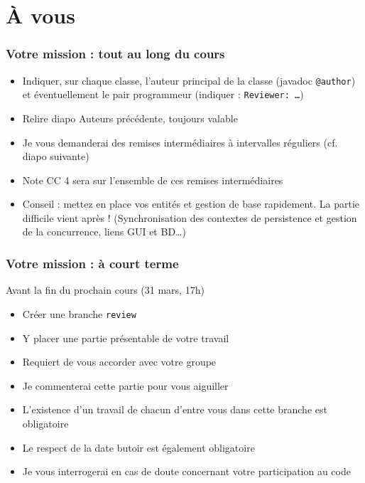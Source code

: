 \documentclass[english, french]{beamer}
\begin{document}
\section{À vous}
\begin{frame}
	\frametitle{Votre mission : tout au long du cours}
	\begin{itemize}
		\item Indiquer, sur chaque classe, l’auteur principal de la classe (javadoc \texttt{@author}) et éventuellement le pair programmeur (indiquer : \texttt{Reviewer: …})
		\item Relire diapo Auteurs précédente, toujours valable
		\item Je vous demanderai des remises intermédiaires à intervalles réguliers (cf. diapo suivante)
		\item Note CC 4 sera sur l’ensemble de ces remises intermédiaires
		\item Conseil : mettez en place vos entités et gestion de base rapidement. La partie difficile vient après ! (Synchronisation des contextes de persistence et gestion de la concurrence, liens GUI et BD…)
	\end{itemize}
\end{frame}

\begin{frame}
	\frametitle{Votre mission : à court terme}
	Avant la fin du prochain cours (31 mars, 17h)
	\begin{itemize}
		\item Créer une branche \texttt{review}
		\item Y placer une partie présentable de votre travail
		\item Requiert de vous accorder avec votre groupe
		\item Je commenterai cette partie pour vous aiguiller
		\item L’existence d’un travail de chacun d’entre vous dans cette branche est obligatoire
		\item Le respect de la date butoir est également obligatoire
		\item Je vous interrogerai en cas de doute concernant votre participation au code
	\end{itemize}
\end{frame}

\appendix
\AtBeginSection{
}
\end{document}
